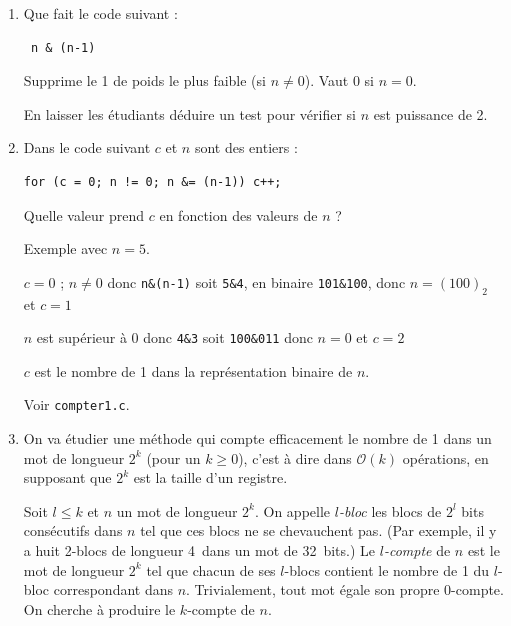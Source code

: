 \documentclass[11pt]{article}
\begin{document}
\begin{enumerate}
 \item Que fait le code suivant :

\begin{verbatim}
 n & (n-1)
\end{verbatim}

\begin{solution}
Supprime le 1 de poids le plus faible (si $n\ne0$). Vaut 0 si $n=0$.
\end{solution}
\begin{remarque}
En laisser les étudiants déduire un test pour vérifier si $n$ est puissance de 2.
\end{remarque}

 \item Dans le code suivant $c$ et $n$ sont des entiers :
\begin{verbatim}
for (c = 0; n != 0; n &= (n-1)) c++;
\end{verbatim}
 Quelle valeur prend $c$ en fonction des valeurs de $n$ ?

\begin{solution}

Exemple avec $n=5$.

$c=0$ ; $n\ne0$ donc \verb+n&(n-1)+ soit \verb+5&4+, en binaire \verb+101&100+,
donc $n=(100)_2$ et $c=1$

$n$ est supérieur à 0 donc \verb+4&3+ soit \verb+100&011+
donc $n=0$ et $c=2$

$c$ est le nombre de 1 dans la représentation binaire de $n$.
\end{solution}
\begin{remarque}
Voir \verb+compter1.c+.
\end{remarque}

\item On va étudier une méthode qui compte efficacement le nombre de 1
 dans un mot de longueur $2^k$ (pour un $k\ge0$), c'est à dire dans
 $\mathcal{O}(k)$ opérations, en supposant que $2^k$ est la taille d'un
 registre.

 Soit $l\le k$ et $n$ un mot de longueur $2^k$.
 On appelle \emph{$l$-bloc} les blocs de $2^l$ bits consécutifs dans $n$
 tel que ces blocs ne se chevauchent pas. (Par exemple, il y a huit 2-blocs
 de longueur 4~dans un mot de 32~bits.) Le \emph{$l$-compte} de $n$
 est le mot de longueur $2^k$ tel que
 chacun de ses $l$-blocs contient le nombre de 1 du
 $l$-bloc correspondant dans $n$.
 Trivialement, tout mot égale son propre $0$-compte.
 On cherche à produire le $k$-compte de $n$.
 

\end{enumerate}
\end{document}
